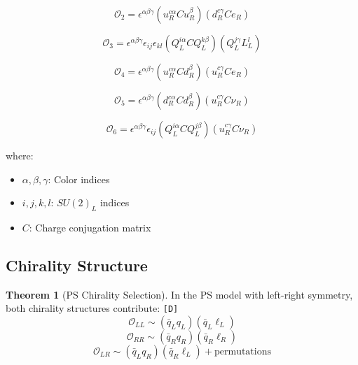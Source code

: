\documentclass[11pt,a4paper]{article}
\newcommand{\tagD}{\textcolor{green!50!black}{\texttt{[D]}}}
\theoremstyle{definition}
\newtheorem{theorem}{Theorem}[section]
\begin{document}
\begin{equation}
\label{eq:operator-uude}
\mathcal{O}_2 = \epsilon^{\alpha\beta\gamma}
(u^{c\alpha}_R C u^{\beta}_R)(d^{c\gamma}_R C e_R)
\end{equation}

\begin{equation}
\label{eq:operator-qqqlL}
\mathcal{O}_3 = \epsilon^{\alpha\beta\gamma} \epsilon_{ij} \epsilon_{kl}
(Q^{i\alpha}_L C Q^{k\beta}_L)(Q^{j\gamma}_L L^l_L)
\end{equation}

\begin{equation}
\label{eq:operator-uudeL}
\mathcal{O}_4 = \epsilon^{\alpha\beta\gamma}
(u^{c\alpha}_R C d^{\beta}_R)(u^{c\gamma}_R C e_R)
\end{equation}

\begin{equation}
\label{eq:operator-ddue}
\mathcal{O}_5 = \epsilon^{\alpha\beta\gamma}
(d^{c\alpha}_R C d^{\beta}_R)(u^{c\gamma}_R C \nu_R)
\end{equation}

\begin{equation}
\label{eq:operator-qqnu}
\mathcal{O}_6 = \epsilon^{\alpha\beta\gamma} \epsilon_{ij}
(Q^{i\alpha}_L C Q^{j\beta}_L)(u^{c\gamma}_R C \nu_R)
\end{equation}

where:
\begin{itemize}
  \item $\alpha, \beta, \gamma$: Color indices
  \item $i, j, k, l$: $SU(2)_L$ indices
  \item $C$: Charge conjugation matrix
\end{itemize}

\subsection{Chirality Structure}
\label{subsec:chirality}

\begin{theorem}[PS Chirality Selection]
\label{thm:chirality}
In the PS model with left-right symmetry, both chirality structures contribute: \tagD{}
\begin{equation}
\label{eq:chirality-ll}
\mathcal{O}_{LL} \sim (\bar{q}_L q_L)(\bar{q}_L \ell_L)
\end{equation}
\begin{equation}
\label{eq:chirality-rr}
\mathcal{O}_{RR} \sim (\bar{q}_R q_R)(\bar{q}_R \ell_R)
\end{equation}
\begin{equation}
\label{eq:chirality-lr}
\mathcal{O}_{LR} \sim (\bar{q}_L q_R)(\bar{q}_R \ell_L) + \text{permutations}
\end{equation}
\end{theorem}
\end{document}
